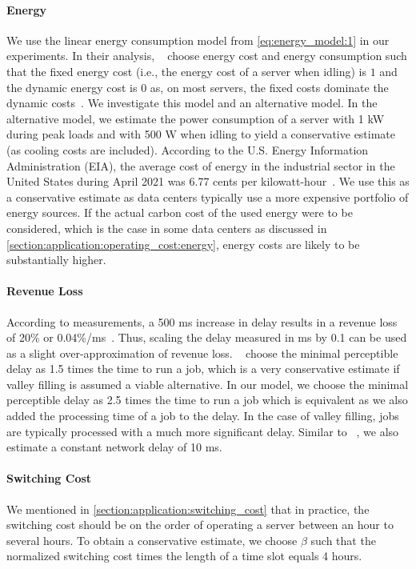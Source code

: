 \paragraph{Energy} We use the linear energy consumption model from \autoref{eq:energy_model:1} in our experiments. In their analysis, \citeauthor*{Lin2011}~\cite{Lin2011} choose energy cost and energy consumption such that the fixed energy cost (i.e., the energy cost of a server when idling) is $1$ and the dynamic energy cost is $0$ as, on most servers, the fixed costs dominate the dynamic costs~\cite{Clark2005}. We investigate this model and an alternative model. In the alternative model, we estimate the power consumption of a server with 1 kW during peak loads and with 500 W when idling to yield a conservative estimate (as cooling costs are included). According to the U.S. Energy Information Administration (EIA), the average cost of energy in the industrial sector in the United States during April 2021 was 6.77 cents per kilowatt-hour~\cite{EIA2021}. We use this as a conservative estimate as data centers typically use a more expensive portfolio of energy sources. If the actual carbon cost of the used energy were to be considered, which is the case in some data centers as discussed in \cref{section:application:operating_cost:energy}, energy costs are likely to be substantially higher.

\paragraph{Revenue Loss} According to measurements, a 500 ms increase in delay results in a revenue loss of 20\% or 0.04\%/ms~\cite{Lin2012, Hamilton2009}. Thus, scaling the delay measured in ms by 0.1 can be used as a slight over-approximation of revenue loss. \citeauthor*{Lin2011}~\cite{Lin2011} choose the minimal perceptible delay as 1.5 times the time to run a job, which is a very conservative estimate if valley filling is assumed a viable alternative. In our model, we choose the minimal perceptible delay as 2.5 times the time to run a job which is equivalent as we also added the processing time of a job to the delay. In the case of valley filling, jobs are typically processed with a much more significant delay. Similar to \citeauthor*{Lin2012}~\cite{Lin2012}, we also estimate a constant network delay of 10 ms.

\paragraph{Switching Cost} We mentioned in \cref{section:application:switching_cost} that in practice, the switching cost should be on the order of operating a server between an hour to several hours. To obtain a conservative estimate, we choose $\beta$ such that the normalized switching cost times the length of a time slot equals 4 hours.

